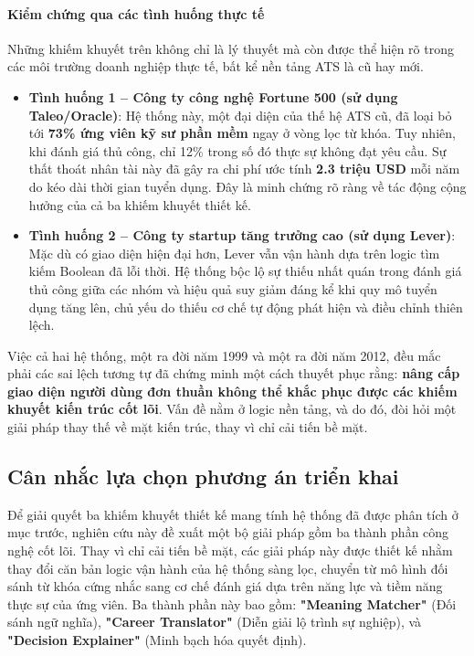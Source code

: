 \documentclass{article}
\begin{document}
\paragraph{Kiểm chứng qua các tình huống thực tế}
Những khiếm khuyết trên không chỉ là lý thuyết mà còn được thể hiện rõ trong các môi trường doanh nghiệp thực tế, bất kể nền tảng ATS là cũ hay mới.
\begin{itemize}[topsep=0pt, itemsep=0pt, leftmargin=40pt]
    \item \textbf{Tình huống 1 – Công ty công nghệ Fortune 500 (sử dụng Taleo/Oracle)}: Hệ thống này, một đại diện của thế hệ ATS cũ, đã loại bỏ tới \textbf{73\% ứng viên kỹ sư phần mềm} ngay ở vòng lọc từ khóa. Tuy nhiên, khi đánh giá thủ công, chỉ 12\% trong số đó thực sự không đạt yêu cầu. Sự thất thoát nhân tài này đã gây ra chi phí ước tính \textbf{2.3 triệu USD} mỗi năm do kéo dài thời gian tuyển dụng. Đây là minh chứng rõ ràng về tác động cộng hưởng của cả ba khiếm khuyết thiết kế.
    \item \textbf{Tình huống 2 – Công ty startup tăng trưởng cao (sử dụng Lever)}: Mặc dù có giao diện hiện đại hơn, Lever vẫn vận hành dựa trên logic tìm kiếm Boolean đã lỗi thời. Hệ thống bộc lộ sự thiếu nhất quán trong đánh giá thủ công giữa các nhóm và hiệu quả suy giảm đáng kể khi quy mô tuyển dụng tăng lên, chủ yếu do thiếu cơ chế tự động phát hiện và điều chỉnh thiên lệch.
\end{itemize}

Việc cả hai hệ thống, một ra đời năm 1999 và một ra đời năm 2012, đều mắc phải các sai lệch tương tự đã chứng minh một cách thuyết phục rằng: \textbf{nâng cấp giao diện người dùng đơn thuần không thể khắc phục được các khiếm khuyết kiến trúc cốt lõi}. Vấn đề nằm ở logic nền tảng, và do đó, đòi hỏi một giải pháp thay thế về mặt kiến trúc, thay vì chỉ cải tiến bề mặt.

\subsection{Cân nhắc lựa chọn phương án triển khai}
Để giải quyết ba khiếm khuyết thiết kế mang tính hệ thống đã được phân tích ở mục trước, nghiên cứu này đề xuất một bộ giải pháp gồm ba thành phần công nghệ cốt lõi. Thay vì chỉ cải tiến bề mặt, các giải pháp này được thiết kế nhằm thay đổi căn bản logic vận hành của hệ thống sàng lọc, chuyển từ mô hình đối sánh từ khóa cứng nhắc sang cơ chế đánh giá dựa trên năng lực và tiềm năng thực sự của ứng viên. Ba thành phần này bao gồm: \textbf{"Meaning Matcher"} (Đối sánh ngữ nghĩa), \textbf{"Career Translator"} (Diễn giải lộ trình sự nghiệp), và \textbf{"Decision Explainer"} (Minh bạch hóa quyết định).
\end{document}
